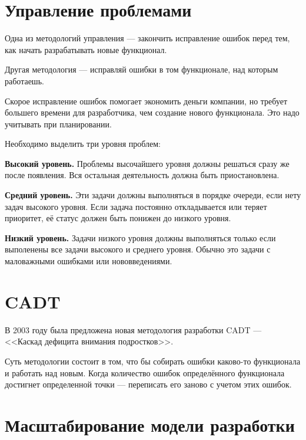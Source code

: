 \section{ Управление проблемами } \label{sect2_18_1}


Одна из методологий управления --- закончить исправление ошибок перед тем, как начать разрабатывать новые функционал.

Другая методология --- исправляй ошибки в том функционале, над которым работаешь.

Скорое исправление ошибок помогает экономить деньги компании, но требует большего времени для разработчика, чем создание нового функционала. Это надо учитывать при планировании.


Необходимо выделить три уровня проблем:

\textbf{Высокий уровень.} Проблемы высочайшего уровня должны решаться сразу же после появления. Вся остальная деятельность должна быть приостановлена.


\textbf{Средний уровень.} Эти задачи должны выполняться в порядке очереди, если нету задач высокого уровня. Если задача постоянно откладывается или теряет приоритет, её статус должен быть понижен до низкого уровня.

\textbf{Низкий уровень.} Задачи низкого уровня должны выполняться только если выполенены все задачи высокого и среднего уровня. Обычно это задачи с маловажными ошибками или нововведениями.

\section{ CADT } \label{sect2_19}

В 2003 году была предложена новая методология разработки CADT --- <<Каскад дефицита внимания подростков>>.

Суть  методологии состоит в том, что бы собирать ошибки каково-то функционала и работать над новым. Когда количество ошибок определённого функционала достигнет определенной точки --- переписать его заново с учетом этих ошибок.


\section{  Масштабирование модели разработки } \label{sect2_20}

